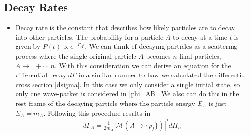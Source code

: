 \documentclass[11pt]{article}
\numberwithin{equation}{section}
\begin{document}
\subsection{Decay Rates} %
\label{sub:decay_rates}
\begin{itemize}
  \item Decay rate is the constant that describes how likely particles are to decay into other particles. The probability for a particle $A$ to decay at a time $t$ is given by $P(t) \propto e^{-\Gamma_{A}t}$. We can think of decaying particles as a scattering process where the single original particle $A$ becomes $n$ final particles, $A \rightarrow 1 +\cdot \cdot \cdot n$. With this consideration we can derive an equation for the differential decay $d\Gamma$ in a similar manner to how we calculated the differential cross section \ref{dsigma}. In this case we only consider a single initial state, so only one wave-packet is considered in \ref{phi_AB}. We also can do this in the rest frame of the decaying particle where the particle energy $E_{A}$ is just $E_A =m_A$. Following this procedure results in:
  \begin{align*}
    d\Gamma_A = \frac{1}{2m_A}|\mathcal{M}(A \rightarrow \{p_f\})|^2d\Pi_n
  \end{align*}
\end{itemize}
\end{document}
